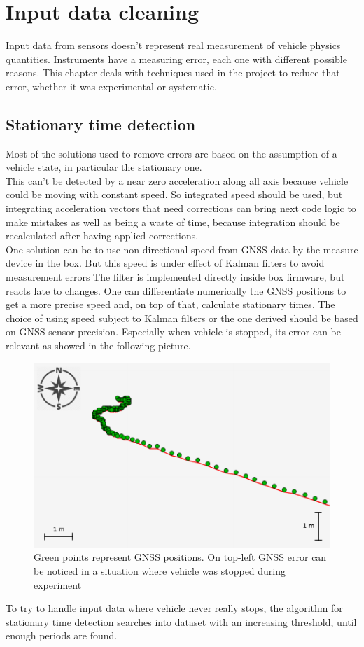 \chapter{Input data cleaning}
\label{chap:input_data_cleaning}

Input data from sensors doesn't represent real measurement of vehicle physics quantities. Instruments have a measuring error, each one with different possible reasons. This chapter deals with techniques used in the project to reduce that error, whether it was experimental or systematic.

\section{Stationary time detection}
Most of the solutions used to remove errors are based on the assumption of a vehicle state, in particular the stationary one. \\
This can't be detected by a near zero acceleration along all axis because vehicle could be moving with constant speed. So integrated speed should be used, but integrating acceleration vectors that need corrections can bring next code logic to make mistakes as well as being a waste of time, because integration should be recalculated after having applied corrections. \\
One solution can be to use non-directional speed from GNSS data by the measure device in the box. But this speed is under effect of Kalman filters to avoid measurement errors The filter is implemented directly inside box firmware, but reacts late to changes. One can differentiate numerically the GNSS positions to get a more precise speed and, on top of that, calculate stationary times. The choice of using speed subject to Kalman filters or the one derived should be based on GNSS sensor precision. Especially when vehicle is stopped, its error can be relevant as showed in the following picture.
\begin{figure}[H]
\includegraphics[width=\textwidth]{gnss_error_stationary_vehicle}
\caption{Green points represent GNSS positions. On top-left GNSS error can be noticed in a situation where vehicle was stopped during experiment}
\end{figure}
\justify
To try to handle input data where vehicle never really stops, the algorithm for stationary time detection searches into dataset with an increasing threshold, until enough periods are found.

